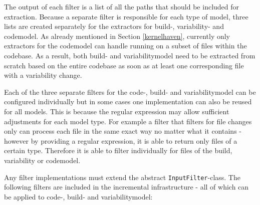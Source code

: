 \documentclass[a4paper]{article}
\begin{document}
The output of each filter is a list of all the paths that should be included for extraction. Because a separate filter is responsible for each type of model, three lists are created separately for the extractors for build-, variability- and codemodel. As already mentioned in Section \ref{kernelhaven}, currently only extractors for the codemodel can handle running on a subset of files within the codebase. As a result, both build- and variabilitymodel need to be extracted from scratch based on the entire codebase as soon as at least one corresponding file with a variability change.

Each of the three separate filters for the code-, build- and variabilitymodel can be configured individually but in some cases one implementation can also be reused for all models. This is because the regular expression may allow sufficient adjustments for each model type. For example a filter that filters for file changes only can process each file in the same exact way no matter what it contains - however by providing a regular expression, it is able to return only files of a certain type. Therefore it is able to filter individually for files of the build, variability or codemodel.

 Any filter implementations must extend the abstract \texttt{InputFilter}-class. The following filters are included in the incremental infrastructure - all of which can be applied to code-, build- and variabilitymodel:
\end{document}
